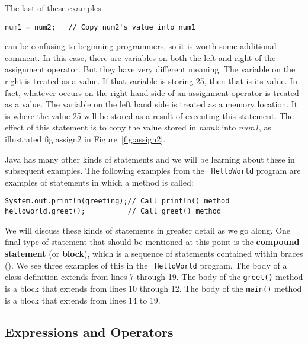 The last of these examples 

\begin{jjjlisting}
\begin{lstlisting}
num1 = num2;   // Copy num2's value into num1
\end{lstlisting}
\end{jjjlisting}

\noindent can be confusing to beginning programmers, so it is worth
some additional comment. In this case, there are variables on both the
left and right of the assignment operator. But they have very
different meaning. The variable on the right is treated as a value. If
that variable is storing 25, then that is its value. In fact, whatever
occurs on the right hand side of an assignment operator is treated as
a value. The variable on the left hand side is treated as a memory
location. It is where the value 25 will be stored as a result of
executing this statement. The effect of this statement is to copy
the value stored in {\it num2} into {\it num1}, as illustrated
{fig:assign2}
in Figure~\ref{fig:assign2}.

Java has many other kinds of statements and we will be learning about
these in subsequent examples. The following examples from the {\tt
HelloWorld} program are examples of statements in which a method
is called:

\begin{jjjlisting}
\begin{lstlisting}
System.out.println(greeting);// Call println() method
helloworld.greet();          // Call greet() method
\end{lstlisting}
\end{jjjlisting}

\noindent We will discuss these kinds of statements in greater 
detail as we go along. One final type of statement that should be
mentioned at this point is the {\bf compound statement} (or {\bf
block}), which is a sequence of statements contained within braces
({}).  We see three examples of this in the {\tt
HelloWorld} program. The body of a class definition extends from lines
7 through 19. The body of the {\tt greet()} method is a block that
extends from lines 10 through 12. The body of the {\tt main()} method
is a block that extends from lines 14 to 19.

\subsection{Expressions and Operators}
\label{subsec:expressions}

